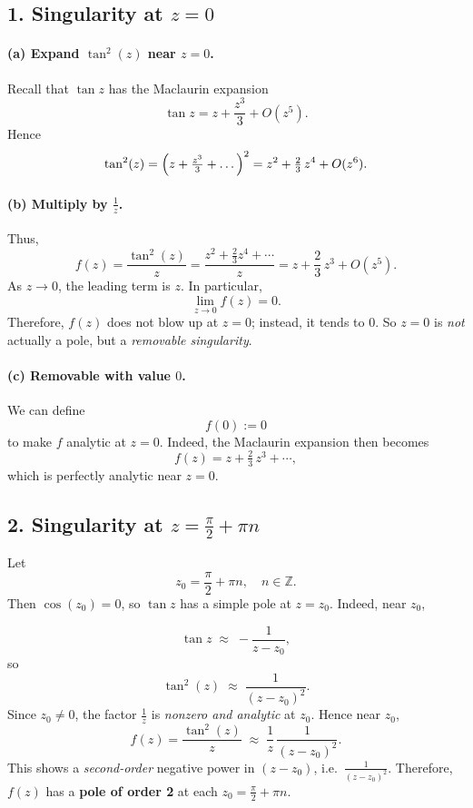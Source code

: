 \documentclass[12pt]{article}
\theoremstyle{definition} %
\theoremstyle{plain} %
\begin{document}
\subsection*{1. Singularity at \(z=0\)}

\paragraph{(a) Expand \(\tan^2(z)\) near \(z=0\).}
Recall that
\(\tan z\) has the Maclaurin expansion
\[
\tan z = z + \frac{z^3}{3} + O(z^5).
\]
Hence
\[
\tan^2(z) 
= \Bigl(z + \tfrac{z^3}{3} + \dots\Bigr)^2
= z^2 + \tfrac{2}{3}\,z^4 + O(z^6).
\]

\paragraph{(b) Multiply by \(\frac{1}{z}\).}
Thus,
\[
f(z) = \frac{\tan^2(z)}{z} 
= \frac{z^2 + \tfrac{2}{3}z^4 + \cdots}{z}
= z + \frac{2}{3}\,z^3 + O(z^5).
\]
As \(z \to 0\), the leading term is \(z\). In particular,
\[
\lim_{z\to 0} f(z) = 0.
\]
Therefore, \(f(z)\) does not blow up at \(z=0\); instead, it tends to \(0\). So \(z=0\) is \emph{not} actually a pole, but a \emph{removable singularity}.

\paragraph{(c) Removable with value \(0\).}
We can define
\[
f(0) := 0
\]
to make \(f\) analytic at \(z=0\). Indeed, the Maclaurin expansion then becomes
\[
f(z) = z + \tfrac{2}{3}\,z^3 + \cdots,
\]
which is perfectly analytic near \(z=0\).

\subsection*{2. Singularity at \(z = \tfrac{\pi}{2} + \pi n\)}

Let
\[
z_0 = \frac{\pi}{2} + \pi n,\quad n\in\mathbb{Z}.
\]
Then \(\cos(z_0)=0\), so \(\tan z\) has a simple pole at \(z=z_0\). Indeed, near \(z_0\),

\[
\tan z \;\approx\; -\frac{1}{z - z_0},
\]
so
\[
\tan^2(z) \;\approx\; \frac{1}{(z - z_0)^2}.
\]
Since \(z_0\neq 0\), the factor \(\tfrac{1}{z}\) is \emph{nonzero and analytic} at \(z_0\).  Hence near \(z_0\),
\[
f(z) = \frac{\tan^2(z)}{z}
\;\approx\; \frac{1}{z}\,\frac{1}{(z - z_0)^2}.
\]
This shows a \emph{second-order} negative power in \((z - z_0)\), i.e.\ \(\frac{1}{(z - z_0)^2}\).  Therefore, \(f(z)\) has a \textbf{pole of order 2} at each \(z_0 = \tfrac{\pi}{2}+\pi n\).
\end{document}
